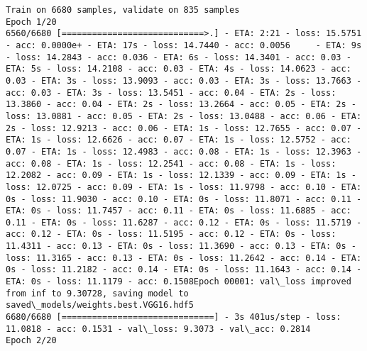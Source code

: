 \documentclass[11pt]{article}
\begin{document}
    \begin{Verbatim}[commandchars=\\\{\}]
Train on 6680 samples, validate on 835 samples
Epoch 1/20
6560/6680 [============================>.] - ETA: 2:21 - loss: 15.5751 - acc: 0.0000e+ - ETA: 17s - loss: 14.7440 - acc: 0.0056     - ETA: 9s - loss: 14.2843 - acc: 0.036 - ETA: 6s - loss: 14.3401 - acc: 0.03 - ETA: 5s - loss: 14.2108 - acc: 0.03 - ETA: 4s - loss: 14.0623 - acc: 0.03 - ETA: 3s - loss: 13.9093 - acc: 0.03 - ETA: 3s - loss: 13.7663 - acc: 0.03 - ETA: 3s - loss: 13.5451 - acc: 0.04 - ETA: 2s - loss: 13.3860 - acc: 0.04 - ETA: 2s - loss: 13.2664 - acc: 0.05 - ETA: 2s - loss: 13.0881 - acc: 0.05 - ETA: 2s - loss: 13.0488 - acc: 0.06 - ETA: 2s - loss: 12.9213 - acc: 0.06 - ETA: 1s - loss: 12.7655 - acc: 0.07 - ETA: 1s - loss: 12.6626 - acc: 0.07 - ETA: 1s - loss: 12.5752 - acc: 0.07 - ETA: 1s - loss: 12.4983 - acc: 0.08 - ETA: 1s - loss: 12.3963 - acc: 0.08 - ETA: 1s - loss: 12.2541 - acc: 0.08 - ETA: 1s - loss: 12.2082 - acc: 0.09 - ETA: 1s - loss: 12.1339 - acc: 0.09 - ETA: 1s - loss: 12.0725 - acc: 0.09 - ETA: 1s - loss: 11.9798 - acc: 0.10 - ETA: 0s - loss: 11.9030 - acc: 0.10 - ETA: 0s - loss: 11.8071 - acc: 0.11 - ETA: 0s - loss: 11.7457 - acc: 0.11 - ETA: 0s - loss: 11.6885 - acc: 0.11 - ETA: 0s - loss: 11.6287 - acc: 0.12 - ETA: 0s - loss: 11.5719 - acc: 0.12 - ETA: 0s - loss: 11.5195 - acc: 0.12 - ETA: 0s - loss: 11.4311 - acc: 0.13 - ETA: 0s - loss: 11.3690 - acc: 0.13 - ETA: 0s - loss: 11.3165 - acc: 0.13 - ETA: 0s - loss: 11.2642 - acc: 0.14 - ETA: 0s - loss: 11.2182 - acc: 0.14 - ETA: 0s - loss: 11.1643 - acc: 0.14 - ETA: 0s - loss: 11.1179 - acc: 0.1508Epoch 00001: val\_loss improved from inf to 9.30728, saving model to saved\_models/weights.best.VGG16.hdf5
6680/6680 [==============================] - 3s 401us/step - loss: 11.0818 - acc: 0.1531 - val\_loss: 9.3073 - val\_acc: 0.2814
Epoch 2/20

\end{Verbatim}
\end{document}
